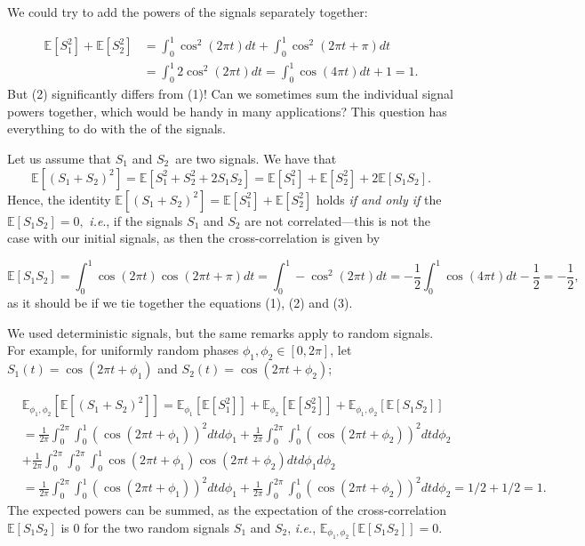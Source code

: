 \documentclass{article}
\begin{document}
We could try to add the powers of the signals separately together:

\begin{align}
  \mathbb{E}[S_1^2] + \mathbb{E}[S_2^2] &=   \int_0^1 \cos^2(2 \pi t) dt + \int_0^1 \cos^2(2 \pi  t + \pi) dt \tag{2} \\
  &= \int_0^1 2 \cos^2(2 \pi t)  dt= \int_0^1 \cos(4 \pi t)dt + 1 = 1. \nonumber
\end{align}
But (2) significantly differs from (1)! Can we sometimes sum the individual signal powers together, which would be handy in many applications? This question has everything to do with the  of the signals.

Let us assume that $S_1$ and $S_2$ are two signals. We have that
\begin{equation}
  \mathbb{E}[(S_1 + S_2)^2] = \mathbb{E}[S_1^2 + S_2^2 + 2 S_1 S_2]= \mathbb{E}[S_1^2] + \mathbb{E}[S_2^2] + 2 \mathbb{E}[S_1 S_2]. \tag{3}
\end{equation}
Hence, the identity $\mathbb{E}[(S_1 + S_2)^2] = \mathbb{E}[S_1^2] + \mathbb{E}[S_2^2] $ holds \textit{if and only if} the  $\mathbb{E}[S_1 S_2] = 0,$ \textit{i.e}., if the signals $S_1$ and $S_2$ are not correlated---this is not the case with our initial signals, as then the cross-correlation is given by

$$
\mathbb{E}[S_1S_2] = \int_0^1 \cos(2 \pi t) \cos(2 \pi t + \pi) dt =\int_0^1 -\cos^2(2 \pi t )dt = - \frac{1}{2}\int_0^1 \cos(4 \pi t)dt - \frac{1}{2} = - \frac{1}{2},
$$
as it should be if we tie together the equations (1), (2) and (3).

We used deterministic signals, but the same remarks apply to random signals. For example, for uniformly random phases $\phi_1,\phi_2 \in [0,2 \pi]$, let $S_1(t) = \cos(2 \pi t + \phi_1)$ and $S_2(t) = \cos(2 \pi t + \phi_2)$;

\begin{align*}
  &\mathbb{E}_{\phi_1,\phi_2} \left[\mathbb{E}[(S_1 + S_2)^2]\right] = \mathbb{E}_{\phi_1} \left[\mathbb{E}\left[ S_1^2\right]\right] + \mathbb{E}_{\phi_2} \left[\mathbb{E}\left[ S_2^2\right]\right] +\mathbb{E}_{\phi_1,\phi_2} \left[\mathbb{E}\left[ S_1S_2\right]\right] \\
  &=\frac{1}{2 \pi}\int_0^{2 \pi} \int_0^1 (\cos(2 \pi t + \phi_1))^2dt d \phi_1 + \frac{1}{2 \pi}\int_0^{2 \pi} \int_0^1 ( \cos(2 \pi t + \phi_2))^2dt  d \phi_2 \\
  &  + \frac{1}{2 \pi}\int_0^{2 \pi} \int_0^{2 \pi}\int_0^1 \cos(2 \pi t + \phi_1) \cos(2 \pi t + \phi_2)dt d \phi_1 d \phi_2\\
  &= \frac{1}{2 \pi}\int_0^{2 \pi} \int_0^1 (\cos(2 \pi t + \phi_1))^2dt d \phi_1  + \frac{1}{2 \pi}\int_0^{2 \pi} \int_0^1 ( \cos(2 \pi t + \phi_2))^2dt  d \phi_2 = 1/2 +1/2 =1.
\end{align*}
The expected powers can be summed, as the expectation of the cross-correlation $\mathbb{E}[S_1 S_2]$ is $0$ for the two random signals $S_1$ and $S_2$, \textit{i.e.}, $\mathbb{E}_{\phi_1,\phi_2} \left[\mathbb{E}\left[ S_1S_2\right]\right] =0$.
\end{document}
